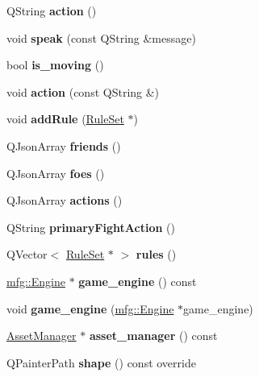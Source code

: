 \begin{DoxyCompactItemize}
Q\+String {\bfseries action} ()
\item 
\mbox{\label{class_actor_a5ac76fa61c5c3d16a89576d20accae57}} 
void {\bfseries speak} (const Q\+String \&message)
\item 
\mbox{\label{class_actor_a27108b4cb5241bcd4adbd0afb3e9632f}} 
bool {\bfseries is\+\_\+moving} ()
\item 
\mbox{\label{class_actor_abca365f0bc4f7c169f1fa59985820164}} 
void {\bfseries action} (const Q\+String \&)
\item 
\mbox{\label{class_actor_aa3fb9dfaa3e0f5ae8ee4a380bdbefe80}} 
void {\bfseries add\+Rule} (\hyperlink{class_rule_set}{Rule\+Set} $\ast$)
\item 
\mbox{\label{class_actor_a716f5b635588ec9cb8d89879e4f1f81e}} 
Q\+Json\+Array {\bfseries friends} ()
\item 
\mbox{\label{class_actor_a963c28667c6a2fac64d975482ed571d7}} 
Q\+Json\+Array {\bfseries foes} ()
\item 
\mbox{\label{class_actor_a07d30fbeb6db8a0fd3d76ed309aaa27e}} 
Q\+Json\+Array {\bfseries actions} ()
\item 
\mbox{\label{class_actor_a33e69369909a1124c509df8730277f9a}} 
Q\+String {\bfseries primary\+Fight\+Action} ()
\item 
\mbox{\label{class_actor_a8ccb0516b4124dac55ecc6c2d25e4751}} 
Q\+Vector$<$ \hyperlink{class_rule_set}{Rule\+Set} $\ast$ $>$ {\bfseries rules} ()
\item 
\mbox{\label{class_actor_abfdaca3d60f8be25ad5d310fbded3fab}} 
\hyperlink{classmfg_1_1_engine}{mfg\+::\+Engine} $\ast$ {\bfseries game\+\_\+engine} () const
\item 
\mbox{\label{class_actor_a1ac165109ea83ae088f67213a9fe9500}} 
void {\bfseries game\+\_\+engine} (\hyperlink{classmfg_1_1_engine}{mfg\+::\+Engine} $\ast$game\+\_\+engine)
\item 
\mbox{\label{class_actor_acffb540df7518225c58da445d271fd86}} 
\hyperlink{class_asset_manager}{Asset\+Manager} $\ast$ {\bfseries asset\+\_\+manager} () const
\item 
\mbox{\label{class_actor_a1acf47e3cba338cf7affaf0116970236}} 
Q\+Painter\+Path {\bfseries shape} () const override
\end{DoxyCompactItemize}
